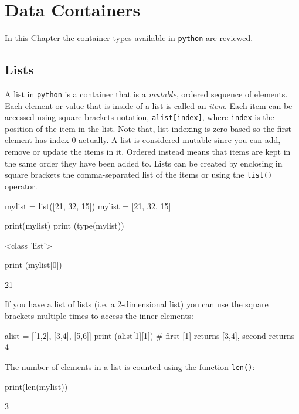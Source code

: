 \chapter{Data Containers}
\label{sec:datacontainer}

In this Chapter the container types available in \texttt{python} are reviewed.

\section{Lists}
\label{lists}

A list in \texttt{python} is a container that is a \emph{mutable}, ordered sequence of elements. Each element or value that is inside of a list is called an \emph{item}. Each item can be accessed using square brackets notation, \texttt{alist[index]}, where \texttt{index} is the position of the item in the list.
Note that, list indexing is zero-based so the first element has index 0 actually. A list is considered mutable since you can add, remove or update the items in it. Ordered instead means that items are kept in the same order they have been added to. Lists can be created by enclosing in square brackets the comma-separated list of the items or using the \texttt{list()} operator.

\begin{ipythonnon}
mylist = list([21, 32, 15])
mylist = [21, 32, 15]

print(mylist)
print (type(mylist))
\end{ipythonnon}
\begin{ioutput}
[21, 32, 15]
<class 'list'>
\end{ioutput}

\begin{ipythonnon}
print (mylist[0])
\end{ipythonnon}
\begin{ioutput}
21
\end{ioutput}

If you have a list of lists (i.e. a 2-dimensional list) you can use the square brackets multiple times to access the inner elements:
\begin{ipythonnon}
alist = [[1,2], [3,4], [5,6]]
print (alist[1][1]) # first [1] returns [3,4], second returns 4                 
\end{ipythonnon}  

The number of elements in a list is counted using the function \texttt{len()}:
\begin{ipythonnon}
print(len(mylist))
\end{ipythonnon}
\begin{ioutput}
3
\end{ioutput}

